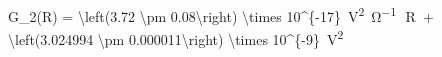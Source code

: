 G_2(R) = \SI[parse-numbers = false]{\left(3.72 \pm 0.08\right) \times 10^{-17}}{\volt^2\per\ohm}\, \cdot \,R\, + \SI[parse-numbers = false]{\left(3.024994 \pm 0.000011\right) \times 10^{-9}}{\volt^2}